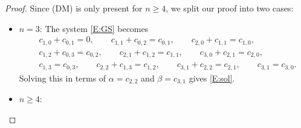 \documentclass[pdftex]{sigma}%
\numberwithin{equation}{section}
\begin{document}
\begin{proof}
Since (DM) is only present for $n \geq 4$, we split our proof into two cases:
\begin{itemize}\itemsep=0pt
\item $n=3$: The system \eqref{E:GS} becomes
\begin{align*}
 &c_{1,0} + c_{0,1} = 0, \qquad
 c_{1,1} + c_{0,2} = c_{0,1},\qquad
 c_{2,0} + c_{1,1} = c_{1,0}, \\
 &c_{1,2} + c_{0,3} = c_{0,2}, \qquad
 c_{2,1} + c_{1,2} = c_{1,1}, \qquad
 c_{3,0} + c_{2,1} = c_{2,0}, \\
& c_{1,3} = c_{0,3}, \qquad
 c_{2,2} + c_{1,3} = c_{1,2}, \qquad
 c_{3,1} + c_{2,2} = c_{2,1}, \qquad
 c_{3,1} = c_{3,0}.
\end{align*}
Solving this in terms of $\alpha = c_{2,2}$ and $\beta = c_{3,1}$ gives \eqref{E:sol}.
\item $n \ge 4$:
	

\end{itemize}
\end{proof}
\end{document}
